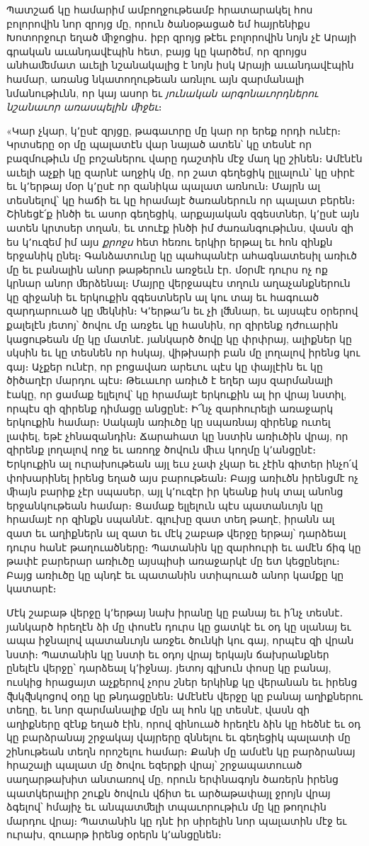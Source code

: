 \documentclass{article}
\begin{document}
{Պատշաճ կը համարիմ ամբողջութեամբ հրատարակել հոս բոլորովին նոր զրոյց մը, որուն ծանօթացած եմ հայրենիքս Խոտորջուր եղած ﬕջոցիս․ իբր զրոյց թէեւ բոլորովին նոյն չէ Արայի գրական աւանդավէպին հետ, բայց կը կարծեմ, որ զրոյցս անհաﬔմատ աւելի նշանակալից է նոյն իսկ Արայի աւանդավէպին համար, առանց նկատողութեան առնլու այն զարմանալի նմանութիւնն, որ կայ ասոր եւ \emph{յունական արգոնաւորդներու նշանաւոր առասպելին ﬕջեւ}։

«Կար չկար, կ՚ըսէ զրյցը, թագաւորը մը կար որ երեք որդի ունէր։ Կրտսերը օր մը պալատէն վար նայած ատեն՝ կը տեսնէ որ բազմութիւն մը բոշաներու վարը դաշտին մէջ մաղ կը շինեն։ Ամէնէն աւելի աչքի կը զարնէ աղջիկ մը, որ շատ գեղեցիկ ըլլալուն՝ կը սիրէ եւ կ՚երթայ մօր կ՚ըսէ որ զանիկա պալատ առնուն։ Մայրն ալ տեսնելով՝ կը հաճի եւ կը հրամայէ ծառաներուն որ պալատ բերեն։ Շինեցէ՛ք ինծի եւ ասոր գեղեցիկ, արքայական զգեստներ, կ՚ըսէ այն ատեն կրտսեր տղան, եւ տուէք ինծի իմ ժառանգութիւնս, վասն զի ես կ՚ուզեմ իմ այս \emph{քրոջս} հետ հեռու երկիր երթալ եւ հոն զինքն երջանիկ ընել։ Գանձատունը կը պահպանէր ահագնատեսիլ առիւծ մը եւ բանալին անոր թաթերուն առջեւն էր․ մօրմէ դուրս ոչ ոք կրնար անոր ﬔրձենալ։ Մայրը վերջապէս տղուն աղաչանքներուն կը զիջանի եւ երկուքին զգեստներն ալ կու տայ եւ հագուած զարդարուած կը ﬔկնին։ Կ՚երթա՚ն եւ չի լﬓնար, եւ այսպէս օրերով քալելէն յետոյ՝ ծովու մը առջեւ կը հասնին, որ զիրենք դժուարին կացութեան մը կը մատնէ․ յանկարծ ծովը կը փրփրայ, ալիքներ կը սկսին եւ կը տեսնեն որ հսկայ, վիթխարի բան մը լողալով իրենց կու գայ։ Աչքեր ունէր, որ բոցավառ արեւու պէս կը փայլէին եւ կը ծիծաղէր մարդու պէս։ Թեւաւոր առիւծ է եղեր այս զարմանալի էակը, որ ցամաք ելլելով՝ կը հրամայէ երկուքին ալ իր վրայ նստիլ, որպէս զի զիրենք դիմացը անցընէ։ Ի՜նչ զարհուրելի առաջարկ երկուքին համար։ Սակայն առիւծը կը սպառնայ զիրենք ուտել լափել, եթէ չհնազանդին։ Ճարահատ կը նստին առիւծին վրայ, որ զիրենք լողալով ողջ եւ առողջ ծովուն ﬕւս կողմը կ՚անցընէ։ Երկուքին ալ ուրախութեան այլ եւս չափ չկար եւ չէին գիտեր ինչո՛վ փոխարինել իրենց եղած այս բարութեան։ Բայց առիւծն իրենցմէ ոչ ﬕայն բարիք չէր սպասեր, այլ կ՚ուզէր իր կեանք իսկ տալ անոնց երջանկութեան համար։ Ցամաք ելլելուն պէս պատանւոյն կը հրամայէ որ զինքն սպաննէ․ գլուխը զատ տեղ թաղէ, իրանն ալ զատ եւ աղիքներն ալ զատ եւ մէկ շաբաթ վերջը երթայ՝ դարձեալ դուրս հանէ թաղուածները։ Պատանին կը զարհուրի եւ ամէն ճիգ կը թափէ բարերար առիւծը այսպիսի առաջարկէ մը ետ կեցընելու։ Բայց առիւծը կը պնդէ եւ պատանին ստիպուած անոր կամքը կը կատարէ։

Մէկ շաբաթ վերջը կ՚երթայ նախ իրանը կը բանայ եւ ի՛նչ տեսնէ․ յանկարծ հրեղէն ձի մը փոսէն դուրս կը ցատկէ եւ օդ կը սլանայ եւ ապա իջնալով պատանւոյն առջեւ ծունկի կու գայ, որպէս զի վրան նստի։ Պատանին կը նստի եւ օդոյ վրայ երկայն ճախրանքներ ընելէն վերջը՝ դարձեալ կ՚իջնայ․ յետոյ գլխուն փոսը կը բանայ, ուսկից հրացայտ աչքերով չորս շներ երկինք կը վերանան եւ իրենց ﬖկﬖկոցով օդը կը թնդացընեն։ Ամէնէն վերջը կը բանայ աղիքներու տեղը, եւ նոր զարմանալիք մըն ալ հոն կը տեսնէ, վասն զի աղիքները զէնք եղած էին, որով զինուած հրեղէն ձին կը հեծնէ եւ օդ կը բարձրանայ շրջակայ վայրերը զննելու եւ գեղեցիկ պալատի մը շինութեան տեղն որոշելու համար։ Քանի մը ամսէն կը բարձրանայ հրաշալի պալատ մը ծովու եզերքի վրայ՝ շրջապատուած սաղարթախիտ անտառով մը, որուն երփնագոյն ծառերն իրենց պատկերալիր շուքն ծովուն վճիտ եւ արծաթափայլ ջրոյն վրայ ձգելով՝ հմայիչ եւ անպատﬔլի տպաւորութիւն մը կը թողուին մարդու վրայ։ Պատանին կը դնէ իր սիրելին նոր պալատին մէջ եւ ուրախ, զուարթ իրենց օրերն կ՚անցընեն։

}
\end{document}
